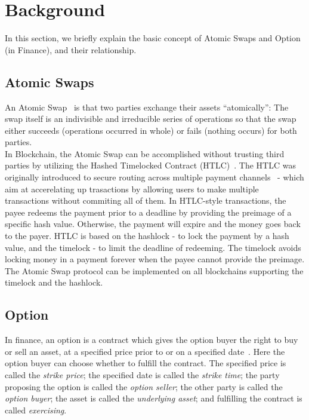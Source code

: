 \section{Background}
\label{sec:background}

In this section, we briefly explain the basic concept of Atomic Swaps and Option (in Finance), and their relationship.

\subsection{Atomic Swaps}

An Atomic Swap~\cite{nolan2013alt} is that two parties exchange their assets ``atomically'':
The swap itself is an indivisible and irreducible series of operations so that the swap either succeeds (operations occurred in whole) or fails (nothing occurs) for both parties. \\

In Blockchain, the Atomic Swap can be accomplished without trusting third parties by utilizing the Hashed Timelocked Contract (HTLC)~\cite{poon2016bitcoin}. The HTLC was originally introduced to secure routing across multiple payment channels~\cite{paychannel2018btcwiki} - which aim at accerelating up trasactions by allowing users to make multiple transactions without commiting all of them.
In HTLC-style transactions, the payee redeems the payment prior to a deadline by providing the preimage of a specific hash value.
Otherwise, the payment will expire and the money goes back to the payer.
HTLC is based on the hashlock - to lock the payment by a hash value, and the timelock - to limit the deadline of redeeming. The timelock avoids locking money in a payment forever when the payee cannot provide the preimage.
The Atomic Swap protocol can be implemented on all blockchains supporting the timelock and the hashlock.


\subsection{Option}
\label{subsec:background_option}

In finance, an option is a contract which gives the option buyer the right to buy or sell an asset, at a specified price prior to or on a specified date~\cite{higham2004introduction}.
Here the option buyer can choose whether to fulfill the contract.
The specified price is called the \textit{strike price};
the specified date is called the \textit{strike time};
the party proposing the option is called the \textit{option seller};
the other party is called the \textit{option buyer};
the asset is called the \textit{underlying asset};
and fulfilling the contract is called \textit{exercising}.

